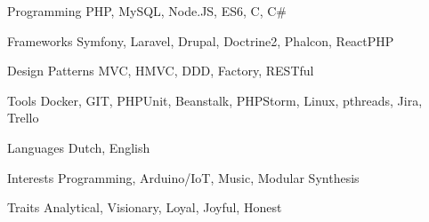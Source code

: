 

\begin{cvskills}

  \cvskill
    {Programming} %
    {PHP, MySQL, Node.JS, ES6, C, C\#} %

  \cvskill
    {Frameworks} %
    {Symfony, Laravel, Drupal, Doctrine2, Phalcon, ReactPHP} %
    
  \cvskill
    {Design Patterns} %
    {MVC, HMVC, DDD, Factory, RESTful} %

  \cvskill
    {Tools} %
    {Docker, GIT, PHPUnit, Beanstalk, PHPStorm, Linux, pthreads, Jira, Trello} %

  \cvskill
    {Languages} %
    {Dutch, English} %

  \cvskill
    {Interests} %
    {Programming, Arduino/IoT, Music, Modular Synthesis} %

  \cvskill
    {Traits} %
    {Analytical, Visionary, Loyal, Joyful, Honest} %
\end{cvskills}
